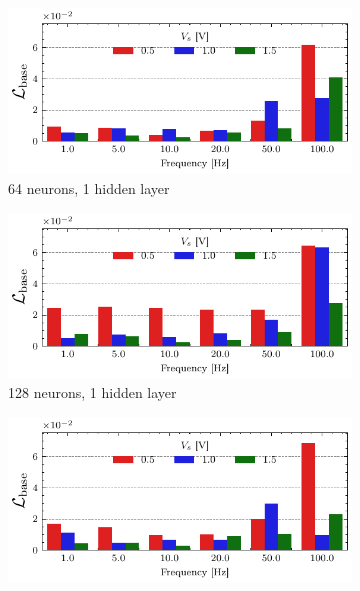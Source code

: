 \documentclass[11pt, oneside]{article}
\begin{document}
\begin{figure}
    \begin{subfigure}[c]{0.48\linewidth}
        \centering
        \includegraphics[width=\linewidth]{sample_results/loss_per_freq_model_silu_64_1best_cpu.pdf}
        \caption{64 neurons, 1 hidden layer}
    \end{subfigure}
    \hfill
    \begin{subfigure}[c]{0.48\linewidth}
        \centering
        \includegraphics[width=\linewidth]{sample_results/loss_per_freq_model_silu_128_1best_cpu.pdf}
        \caption{128 neurons, 1 hidden layer}
    \end{subfigure}
    \begin{subfigure}[c]{0.48\linewidth}
        \centering
        \includegraphics[width=\linewidth]{sample_results/loss_per_freq_model_silu_128_3best_cpu.pdf}

\end{subfigure}
\end{figure}
\end{document}
